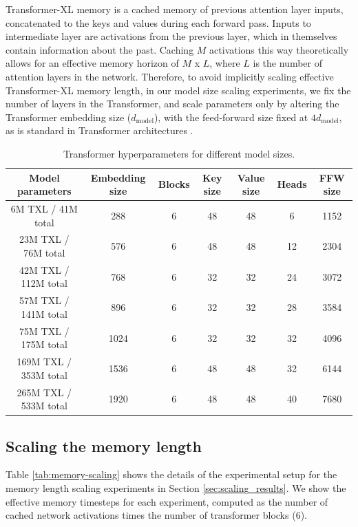 Transformer-XL memory is a cached memory of previous attention layer inputs, concatenated to the keys and values during each forward pass. Inputs to intermediate layer are activations from the previous layer, which in themselves contain information about the past. Caching $M$ activations this way theoretically allows for an effective memory horizon of $M$ x $L$, where $L$ is the number of attention layers in the network.
Therefore, to avoid implicitly scaling effective Transformer-XL memory length, in our model size scaling experiments, we fix the number of layers in the Transformer, and scale parameters only by altering the Transformer embedding size ($d_\textrm{model}$), with the feed-forward size fixed at $4 d_\textrm{model}$, as is standard in Transformer architectures \citep{vaswani2017attention}.

\begin{table}[h!]
  \begin{center}
    \caption{Transformer hyperparameters for different model sizes.}
    \begin{tabular}{c|c|c|c|c|c|c}
    \label{tab:model_hparams}
      Model parameters & Embedding size & Blocks & Key size & Value size & Heads & FFW size\\
      \hline
      6M TXL / 41M total & 288 & 6 & 48 & 48 & 6 & 1152\\
      23M TXL / 76M total & 576 & 6 & 48 & 48 & 12 & 2304\\
      42M TXL / 112M total & 768 & 6 & 32 & 32 & 24 & 3072\\
      57M TXL / 141M total & 896 & 6 & 32 &32 & 28 & 3584\\
      75M TXL / 175M total & 1024 & 6 & 32 & 32 & 32 & 4096\\
      169M TXL / 353M total & 1536 & 6 & 48 & 48 & 32 & 6144\\
      265M TXL / 533M total & 1920 & 6 & 48 & 48 & 40 & 7680\\
    \end{tabular}
  \end{center}
\end{table}


\subsection{Scaling the memory length}
\label{app:memory-scaling}
Table \ref{tab:memory-scaling} shows the details of the experimental setup for the memory length scaling experiments in Section \ref{sec:scaling_results}. We show the effective memory timesteps for each experiment, computed as the number of cached network activations times the number of transformer blocks (6).

